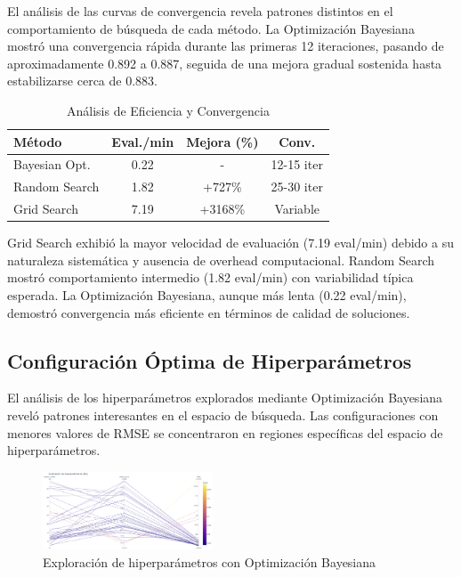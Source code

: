 \documentclass[conference]{IEEEtran}
\begin{document}
El análisis de las curvas de convergencia revela patrones distintos en el comportamiento de búsqueda de cada método. La Optimización Bayesiana mostró una convergencia rápida durante las primeras 12 iteraciones, pasando de aproximadamente 0.892 a 0.887, seguida de una mejora gradual sostenida hasta estabilizarse cerca de 0.883.

\begin{table}[htbp]
\caption{Análisis de Eficiencia y Convergencia}
\begin{center}
\small
\begin{tabular}{|l|c|c|c|}
\hline
\textbf{Método} & \textbf{Eval./min} & \textbf{Mejora (\%)} & \textbf{Conv.} \\
\hline
Bayesian Opt. & 0.22 & - & 12-15 iter \\
\hline
Random Search & 1.82 & +727\% & 25-30 iter \\
\hline
Grid Search & 7.19 & +3168\% & Variable \\
\hline
\end{tabular}
\label{tab:eficiencia}
\end{center}
\end{table}

Grid Search exhibió la mayor velocidad de evaluación (7.19 eval/min) debido a su naturaleza sistemática y ausencia de overhead computacional. Random Search mostró comportamiento intermedio (1.82 eval/min) con variabilidad típica esperada. La Optimización Bayesiana, aunque más lenta (0.22 eval/min), demostró convergencia más eficiente en términos de calidad de soluciones.

\subsection{Configuración Óptima de Hiperparámetros}

El análisis de los hiperparámetros explorados mediante Optimización Bayesiana reveló patrones interesantes en el espacio de búsqueda. Las configuraciones con menores valores de RMSE se concentraron en regiones específicas del espacio de hiperparámetros.

\begin{figure}[htbp]
  \centering
  \includegraphics[width=0.45\textwidth]{fig_hiperparametros.png}
  \caption{Exploración de hiperparámetros con Optimización Bayesiana}
  \label{fig:hiperparametros}
\end{figure}
\end{document}
